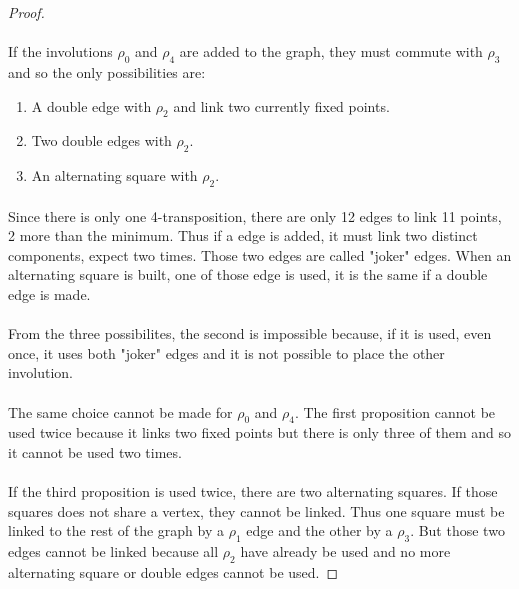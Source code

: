 \begin{proof}
\paragraph{}
If the involutions $\rho_0$ and $\rho_4$ are added to the graph, they must commute with $\rho_3$ and so the only possibilities are:
\begin{enumerate}
  \item A double edge with $\rho_2$ and link two currently fixed points.
  \item Two double edges with $\rho_2$.
  \item An alternating square with $\rho_2$.
\end{enumerate}

\paragraph{}
Since there is only one 4-transposition, there are only 12 edges to link 11 points, 2 more than the minimum. Thus if a edge is added, it must link two distinct components, expect two times. Those two edges are called "joker" edges. When an alternating square is built, one of those edge is used, it is the same if a double edge is made.

\paragraph{}
From the three possibilites, the second is impossible because, if it is used, even once, it uses both "joker" edges and it is not possible to place the other involution.

\paragraph{}
The same choice cannot be made for $\rho_0$ and $\rho_4$. The first proposition cannot be used twice because it links two fixed points but there is only three of them and so it cannot be used two times.

\paragraph{}
If the third proposition is used twice, there are two alternating squares. If those squares does not share a vertex, they cannot be linked. Thus one square must be linked to the rest of the graph by a $\rho_1$ edge and the other by a $\rho_3$. But those two edges cannot be linked because all $\rho_2$ have already be used and no more alternating square or double edges cannot be used.


\end{proof}

